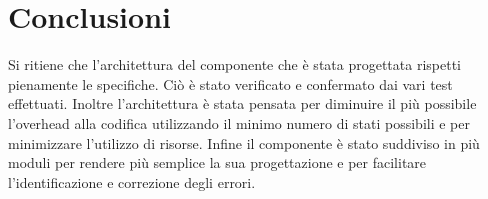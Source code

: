 \documentclass[fleqn,11pt]{article}
\begin{document}
\section{Conclusioni}
Si ritiene che l'architettura del componente che è stata progettata rispetti pienamente le specifiche. Ciò è stato verificato e confermato dai vari test effettuati.
Inoltre l'architettura è stata pensata per diminuire il più possibile l'overhead alla codifica utilizzando il minimo numero di stati possibili e per minimizzare l'utilizzo di risorse.
Infine il componente è stato suddiviso in più moduli per rendere più semplice la sua progettazione e per facilitare l'identificazione e correzione degli errori.
\end{document}

